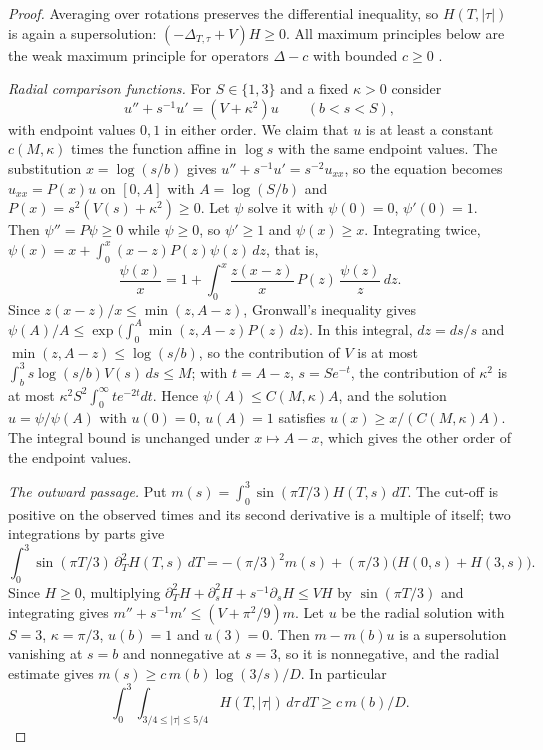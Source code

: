 \begin{proof}
Averaging over rotations preserves the differential inequality, so $H(T,|\tau|)$ is again a
supersolution: $(-\Delta_{T,\tau}+V)H\ge0$. All maximum principles below are the weak maximum
principle for operators $\Delta-c$ with bounded $c\ge0$ \cite[Corollary 3.2]{GT01}.

\emph{Radial comparison functions.} For $S\in\{1,3\}$ and a fixed $\kappa>0$ consider
\[
u''+s^{-1}u'=(V+\kappa^2)u\qquad(b<s<S),
\]
with endpoint values $0,1$ in either order. We claim that $u$ is at least a constant $c(M,\kappa)$
times the function affine in $\log s$ with the same endpoint values. The substitution
$x=\log(s/b)$ gives $u''+s^{-1}u'=s^{-2}u_{xx}$, so the equation becomes $u_{xx}=P(x)u$ on $[0,A]$
with $A=\log(S/b)$ and $P(x)=s^2(V(s)+\kappa^2)\ge0$. Let $\psi$ solve it with $\psi(0)=0$,
$\psi'(0)=1$. Then $\psi''=P\psi\ge0$ while $\psi\ge0$, so $\psi'\ge1$ and $\psi(x)\ge x$. Integrating
twice, $\psi(x)=x+\int_0^x(x-z)P(z)\psi(z)\,dz$, that is,
\[
\frac{\psi(x)}x=1+\int_0^x\frac{z(x-z)}{x}\,P(z)\,\frac{\psi(z)}z\,dz .
\]
Since $z(x-z)/x\le\min(z,A-z)$, Gronwall's inequality gives
$\psi(A)/A\le\exp\bigl(\int_0^A\min(z,A-z)P(z)\,dz\bigr)$. In this integral, $dz=ds/s$ and
$\min(z,A-z)\le\log(s/b)$, so the contribution of $V$ is at most
$\int_b^3s\log(s/b)V(s)\,ds\le M$; with $t=A-z$, $s=Se^{-t}$, the contribution of $\kappa^2$ is at
most $\kappa^2S^2\int_0^\infty te^{-2t}dt$. Hence $\psi(A)\le C(M,\kappa)A$, and the solution
$u=\psi/\psi(A)$ with $u(0)=0$, $u(A)=1$ satisfies $u(x)\ge x/(C(M,\kappa)A)$. The integral bound is
unchanged under $x\mapsto A-x$, which gives the other order of the endpoint values.

\emph{The outward passage.} Put $m(s)=\int_0^3\sin(\pi T/3)H(T,s)\,dT$. The cut-off is positive on
the observed times and its second derivative is a multiple of itself; two integrations by parts
give
\[
\int_0^3\sin(\pi T/3)\,\partial_T^2H(T,s)\,dT=-(\pi/3)^2m(s)+(\pi/3)\bigl(H(0,s)+H(3,s)\bigr).
\]
Since $H\ge0$, multiplying $\partial_T^2H+\partial_s^2H+s^{-1}\partial_sH\le VH$ by $\sin(\pi T/3)$ and
integrating gives $m''+s^{-1}m'\le(V+\pi^2/9)m$. Let $u$ be the radial solution with $S=3$,
$\kappa=\pi/3$, $u(b)=1$ and $u(3)=0$. Then $m-m(b)u$ is a supersolution vanishing at $s=b$ and
nonnegative at $s=3$, so it is nonnegative, and the radial estimate gives
$m(s)\ge c\,m(b)\log(3/s)/D$. In particular
\begin{equation}\label{eq:outward}
\int_0^3\!\!\int_{3/4\le|\tau|\le5/4}H(T,|\tau|)\,d\tau\,dT\ge c\,m(b)/D .
\end{equation}


\end{proof}
